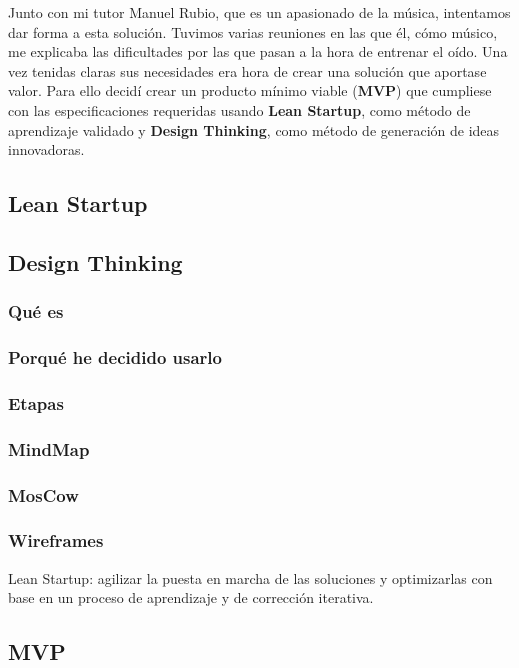 \documentclass[12pt,twoside,titlepage]{report}
\begin{document}
Junto con mi tutor Manuel Rubio, que es un apasionado de la música, intentamos dar forma a esta solución. Tuvimos varias reuniones en las que él, cómo músico, me explicaba las dificultades por las que pasan a la hora de entrenar el oído. Una vez tenidas claras sus necesidades era hora de crear una solución que aportase valor. Para ello decidí crear un producto mínimo viable (\textbf{MVP}) que cumpliese con las especificaciones requeridas usando \textbf{Lean Startup}, como método de aprendizaje validado y \textbf{Design Thinking}, como método de generación de ideas innovadoras.

\subsection{Lean Startup}

\subsection{Design Thinking}

\subsubsection{Qué es}
\subsubsection{Porqué he decidido usarlo}
\subsubsection{Etapas}


\subsubsection{MindMap}

\subsubsection{MosCow}

\subsubsection{Wireframes}


Lean Startup: agilizar la puesta en marcha de las soluciones y optimizarlas con base en un proceso de aprendizaje y de corrección iterativa.

\subsection{MVP}
\end{document}
